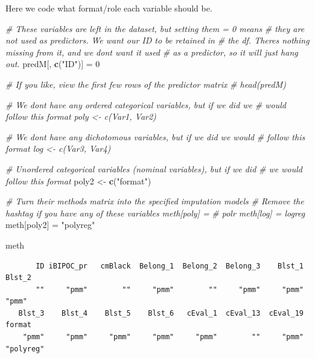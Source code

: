 \documentclass[
  11pt,
]{book}
\newenvironment{Shaded}{\begin{snugshade}}{\end{snugshade}}
\newcommand{\CommentTok}[1]{\textcolor[rgb]{0.37,0.37,0.37}{\textit{#1}}}
\newcommand{\DecValTok}[1]{\textcolor[rgb]{0.06,0.06,0.06}{#1}}
\newcommand{\FunctionTok}[1]{\textcolor[rgb]{0.27,0.27,0.27}{\textbf{#1}}}
\newcommand{\NormalTok}[1]{#1}
\newcommand{\OtherTok}[1]{\textcolor[rgb]{0.37,0.37,0.37}{#1}}
\newcommand{\StringTok}[1]{\textcolor[rgb]{0.5,0.5,0.5}{#1}}
\begin{document}
Here we code what format/role each variable should be.

\begin{Shaded}
\begin{Highlighting}[]
\CommentTok{\# These variables are left in the dataset, but setting them = 0 means}
\CommentTok{\# they are not used as predictors.  We want our ID to be retained in}
\CommentTok{\# the df.  There\textquotesingle{}s nothing missing from it, and we don\textquotesingle{}t want it used}
\CommentTok{\# as a predictor, so it will just hang out.}
\NormalTok{predM[, }\FunctionTok{c}\NormalTok{(}\StringTok{"ID"}\NormalTok{)] }\OtherTok{=} \DecValTok{0}

\CommentTok{\# If you like, view the first few rows of the predictor matrix}
\CommentTok{\# head(predM)}

\CommentTok{\# We don\textquotesingle{}t have any ordered categorical variables, but if we did we}
\CommentTok{\# would follow this format poly \textless{}{-} c(\textquotesingle{}Var1\textquotesingle{}, \textquotesingle{}Var2\textquotesingle{})}

\CommentTok{\# We don\textquotesingle{}t have any dichotomous variables, but if we did we would}
\CommentTok{\# follow this format log \textless{}{-} c(\textquotesingle{}Var3\textquotesingle{}, \textquotesingle{}Var4\textquotesingle{})}

\CommentTok{\# Unordered categorical variables (nominal variables), but if we did}
\CommentTok{\# we would follow this format}
\NormalTok{poly2 }\OtherTok{\textless{}{-}} \FunctionTok{c}\NormalTok{(}\StringTok{"format"}\NormalTok{)}

\CommentTok{\# Turn their methods matrix into the specified imputation models}
\CommentTok{\# Remove the hashtag if you have any of these variables meth[poly] =}
\CommentTok{\# \textquotesingle{}polr\textquotesingle{} meth[log] = \textquotesingle{}logreg\textquotesingle{}}
\NormalTok{meth[poly2] }\OtherTok{=} \StringTok{"polyreg"}

\NormalTok{meth}
\end{Highlighting}
\end{Shaded}

\begin{verbatim}
       ID iBIPOC_pr   cmBlack  Belong_1  Belong_2  Belong_3    Blst_1    Blst_2 
       ""     "pmm"        ""     "pmm"        ""     "pmm"     "pmm"     "pmm" 
   Blst_3    Blst_4    Blst_5    Blst_6   cEval_1  cEval_13  cEval_19    format 
    "pmm"     "pmm"     "pmm"     "pmm"     "pmm"        ""     "pmm" "polyreg" 
\end{verbatim}
\end{document}
